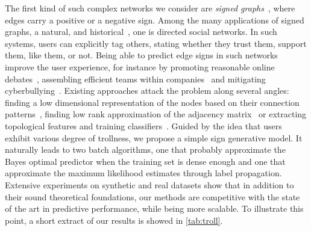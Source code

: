 The first kind of such complex networks we consider are \emph{signed graphs}~\autocite{Tang2015a},
where edges carry a positive or a negative sign. Among the many applications of signed graphs, a
natural, and historical~\autocite{harary1953}, one is directed social networks. In such systems,
users can explicitly tag others, stating whether they trust them, support them, like them, or not.
Being able to predict edge signs in such networks improve the user experience, for instance by
promoting reasonable online debates~\autocite{journalism15}, assembling efficient teams within
companies~\autocite{MLinHR16} and mitigating cyberbullying~\autocite{cyberbullying13}. Existing
approaches attack the problem along several angles: finding a low dimensional representation of the
nodes based on their connection patterns~\autocites{SIGNet17}{SNE17}, finding low rank approximation
of the adjacency matrix~\autocites{LowRankCompletion14}{OnlineCompletion17} or extracting
topological features and training classifiers~\autocites{Leskovec2010}{Bayesian15}{wu2016troll}.
Guided by the idea that users exhibit various degree of trollness, we propose a simple sign
generative model. It naturally leads to two batch algorithms, one that probably approximate the
Bayes optimal predictor when the training set is dense enough and one that approximate the maximum
likelihood estimates through label propagation. Extensive experiments on synthetic and real datasets
show that in addition to their sound theoretical foundations, our methods are competitive with the
state of the art in predictive performance, while being more scalable. To illustrate this point, a
short extract of our results is showed in \autoref{tab:troll}.

